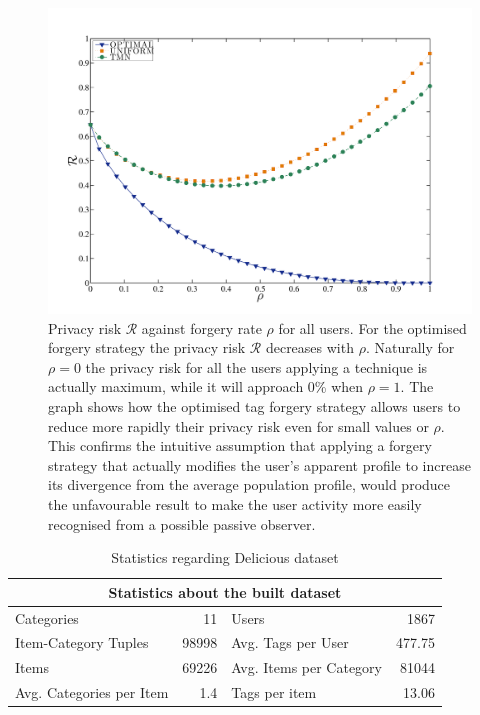 \begin{figure}[htb]  
\includegraphics[width=\textwidth]{figures/Fig4a.pdf}
\caption[Privacy risk for all users.]{Privacy risk $\mathcal{R}$ against forgery rate $\rho$ for all users. For the optimised forgery strategy the privacy risk $\mathcal{R}$ decreases with $\rho$. Naturally for $\rho = 0$ the privacy risk for all the users applying a technique is actually maximum, while it will approach 0\% when $\rho = 1 $. The graph shows how the optimised tag forgery strategy allows users to reduce more rapidly their privacy risk even for small values or $ \rho $. This confirms the intuitive assumption that applying a forgery strategy that actually modifies the user's apparent profile to increase its divergence from the average population profile, would produce the unfavourable result to make the user activity more easily recognised from a possible passive observer.}
\label{fig:Risk-Rho}
\end{figure}

\begin{table}[htbp]
\centering
\caption{Statistics regarding Delicious dataset}
\def\arraystretch{2.5}
\begin{tabular}{| l | r | l | r | }
\hline
\multicolumn{4}{|c|}{Statistics about the built dataset}            \\[2.5mm] \hline
Categories               & 11    & Users                   & 1867   \\[2.5mm] \hline
Item-Category Tuples     & 98998 & Avg. Tags per User      & 477.75 \\[2.5mm] \hline
Items                    & 69226 & Avg. Items per Category & 81044  \\[2.5mm]\hline
Avg. Categories per Item & 1.4   & Tags per item           & 13.06  \\[2.5mm]\hline
\end{tabular}
\label{table:DatasetStats}
\end{table}

